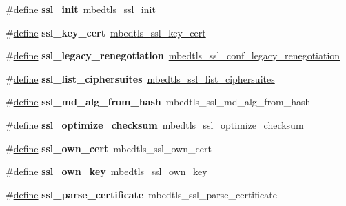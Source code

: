 \begin{DoxyCompactItemize}
\#\hyperlink{structdefine}{define} {\bfseries ssl\+\_\+init}~\hyperlink{ssl_8h_a8560dea66d7830a11874188727ec4c45}{mbedtls\+\_\+ssl\+\_\+init}
\item 
\mbox{\label{compat-1_83_8h_a678d21a985f97cd767eacf4599df1e81}} 
\#\hyperlink{structdefine}{define} {\bfseries ssl\+\_\+key\+\_\+cert}~\hyperlink{structmbedtls__ssl__key__cert}{mbedtls\+\_\+ssl\+\_\+key\+\_\+cert}
\item 
\mbox{\label{compat-1_83_8h_a836a9ac27eb7d2be53298c8d44336b8b}} 
\#\hyperlink{structdefine}{define} {\bfseries ssl\+\_\+legacy\+\_\+renegotiation}~\hyperlink{ssl_8h_a193c7bf368780f485e20170c807709e5}{mbedtls\+\_\+ssl\+\_\+conf\+\_\+legacy\+\_\+renegotiation}
\item 
\mbox{\label{compat-1_83_8h_a8cda05be9346c27bbc0ab1156e0b301a}} 
\#\hyperlink{structdefine}{define} {\bfseries ssl\+\_\+list\+\_\+ciphersuites}~\hyperlink{ssl_8h_aa475d287496d8a93a236a9b91b71dc87}{mbedtls\+\_\+ssl\+\_\+list\+\_\+ciphersuites}
\item 
\mbox{\label{compat-1_83_8h_a25ea91037dc70b910df9d0637c5fe6b8}} 
\#\hyperlink{structdefine}{define} {\bfseries ssl\+\_\+md\+\_\+alg\+\_\+from\+\_\+hash}~mbedtls\+\_\+ssl\+\_\+md\+\_\+alg\+\_\+from\+\_\+hash
\item 
\mbox{\label{compat-1_83_8h_a22dfb02639f9509293df3133f293924a}} 
\#\hyperlink{structdefine}{define} {\bfseries ssl\+\_\+optimize\+\_\+checksum}~mbedtls\+\_\+ssl\+\_\+optimize\+\_\+checksum
\item 
\mbox{\label{compat-1_83_8h_a17fb951f5a9f0fd47af96a5a7dae2153}} 
\#\hyperlink{structdefine}{define} {\bfseries ssl\+\_\+own\+\_\+cert}~mbedtls\+\_\+ssl\+\_\+own\+\_\+cert
\item 
\mbox{\label{compat-1_83_8h_abbaf94c0a47b1c7a6c77a95da30e72a0}} 
\#\hyperlink{structdefine}{define} {\bfseries ssl\+\_\+own\+\_\+key}~mbedtls\+\_\+ssl\+\_\+own\+\_\+key
\item 
\mbox{\label{compat-1_83_8h_afdb9480acfc37becc3a1084c042cca67}} 
\#\hyperlink{structdefine}{define} {\bfseries ssl\+\_\+parse\+\_\+certificate}~mbedtls\+\_\+ssl\+\_\+parse\+\_\+certificate

\end{DoxyCompactItemize}
